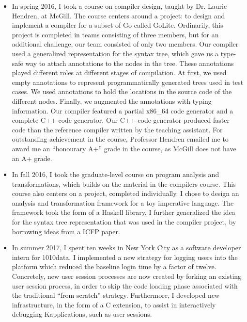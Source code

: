 \documentclass[11pt,letterpaper]{article}
\begin{document}
\begin{itemize}
  \item
    In spring 2016, I took a course on compiler design, taught by Dr. Laurie
    Hendren, at McGill. The course centers around a project: to design and
    implement a compiler for a subset of Go called GoLite. Ordinarily, this
    project is completed in teams consisting of three members, but for an
    additional challenge, our team consisted of only two members. Our compiler
    used a generalized representation for the syntax tree, which gave us a
    type-safe way to attach annotations to the nodes in the tree. These
    annotations played different roles at different stages of compilation. At
    first, we used empty annotations to represent programmatically generated
    trees used in test cases.  We used annotations to hold the locations in the
    source code of the different nodes. Finally, we augmented the annotations
    with typing information.
    Our compiler featured a partial x86\_64 code generator and a complete C++
    code generator. Our C++ code generator produced faster code than the
    reference compiler written by the teaching assistant.
    For outstanding achievement in the course, Professor Hendren emailed me to
    award me an ``honourary A+'' grade in the course, as McGill does not have
    an A+ grade.

  \item
    In fall 2016, I took the graduate-level course on program analysis and
    transformations, which builds on the material in the compilers course.
    This course also centers on a project, completed individually. I chose to
    design an analysis and transformation framework for a toy imperative
    language.  The framework took the form of a Haskell library. I further
    generalized the idea for the syntax tree representation that was used in
    the compiler project, by borrowing ideas from a ICFP paper\footnotemark.

  \item
    In summer 2017, I spent ten weeks in New York City as a software developer
    intern for 1010data\footnotemark{}. I implemented a new strategy for
    logging users into the platform which reduced the baseline login time by a
    factor of twelve. Concretely, new user session processes are now created by
    forking an existing user session process, in order to skip the code loading
    phase associated with the traditional ``from scratch'' strategy.
    Furthermore, I developed new infrastructure, in the form of a C extension,
    to assist in interactively debugging K\footnotemark applications, such as
    user sessions.
\end{itemize}
\end{document}
